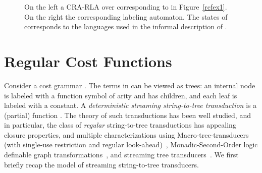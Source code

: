 \documentclass[11pt]{article}
\newcommand{\REDWA}{{CRA}-{RLA}\xspace}
\begin{document}
\begin{figure}[t]
\centering
{}
\caption{On the left a \REDWA over  corresponding to  in
Figure~\ref{rcfex1}. On the right the corresponding labeling automaton.
The states of  corresponds to the languages used in the informal description of .
\label{cra_rla}}
\end{figure}


\section{Regular Cost Functions} \label{sec:rcf}
Consider a cost grammar .  The terms in 
can be viewed as trees: an internal node is labeled with a function
symbol  of arity  and has  children, and each leaf is
labeled with a constant.  A {\em deterministic streaming
string-to-tree transduction\/} is a (partial) function .  The theory of such transductions has been well
studied, and in particular, the class of {\em regular\/}
string-to-tree transductions has appealing closure properties, and
multiple characterizations using Macro-tree-transducers (with
single-use restriction and regular
look-ahead)~\cite{engelfriet_macro2_1999}, Monadic-Second-Order logic
definable graph transformations~\cite{courcelle_graph_2002}, and
streaming tree transducers~\cite{alur_stt_2011}.  We first briefly
recap the model of streaming string-to-tree transducers.
\end{document}

